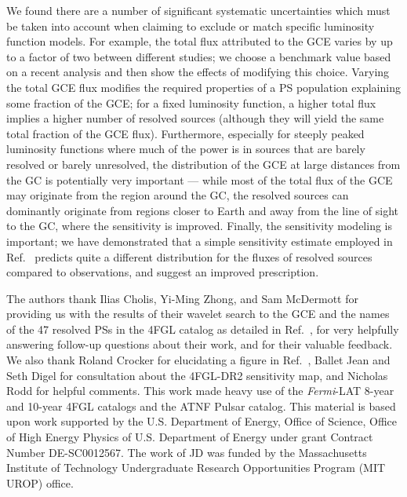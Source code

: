 \documentclass[letter,11pt]{article}
\begin{document}
We found there are a number of significant systematic uncertainties which must be taken into account when claiming to exclude or match specific luminosity function models. For example, the total flux attributed to the GCE varies by up to a factor of two between different studies; we choose a benchmark value based on a recent analysis \cite{DiMauro:2021raz} and then show the effects of modifying this choice. Varying the total GCE flux modifies the required properties of a PS population explaining some fraction of the GCE; for a fixed luminosity function, a higher total flux implies a higher number of resolved sources (although they will yield the same total fraction of the GCE flux). Furthermore, especially for steeply peaked luminosity functions where much of the power is in sources that are barely resolved or barely unresolved, the distribution of the GCE at large distances from the GC is potentially very important --- while most of the total flux of the GCE may originate from the region around the GC, the resolved sources can dominantly originate from regions closer to Earth and away from the line of sight to the GC, where the sensitivity is improved. Finally, the sensitivity modeling is important; we have demonstrated that a simple sensitivity estimate employed in Ref.~\cite{Zhong:2019ycb} predicts quite a different distribution for the fluxes of resolved sources compared to observations, and suggest an improved prescription.

\acknowledgments
The authors thank Ilias Cholis, Yi-Ming Zhong, and Sam McDermott for providing us with the results of their wavelet search to the GCE and the names of the 47 resolved PSs in the 4FGL catalog as detailed in Ref.~\cite{Zhong:2019ycb}, for very helpfully answering follow-up questions about their work, and for their valuable feedback. We also thank Roland Crocker for elucidating a figure in Ref.~\cite{Gautam:2021wqn}, Ballet Jean and Seth Digel for consultation about the 4FGL-DR2 sensitivity map, and Nicholas Rodd for helpful comments. This work made heavy use of the {\it Fermi}-LAT 8-year and 10-year 4FGL catalogs and the ATNF Pulsar catalog. This material is based upon work supported by the U.S. Department of Energy, Office of Science, Office of High Energy Physics of U.S. Department of Energy under grant Contract Number  DE-SC0012567. The work of JD was funded by the Massachusetts Institute of Technology Undergraduate Research Opportunities Program (MIT UROP) office.
\end{document}
